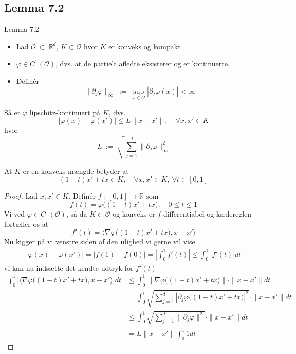 \subsection{Lemma 7.2}
\begin{boks}{Lemma 7.2}
  \begin{itemize}[label = $\ast$]
    \item Lad $\mathcal{O} \ \dot{\subset} \ \mathbb{R}^d$, $K \subset \mathcal{O}$ hvor $K$ er konveks og kompakt
    \item $\varphi \in C^1(\mathcal{O})$, dvs. at de partielt afledte eksisterer og er kontinuerte.
    \item Definér
    $$ \| \partial_j \varphi \|_\infty \ := \ \sup_{x \in \mathcal{O}} | \partial_j \varphi(x) | < \infty$$
  \end{itemize}
  Så er $\varphi$ lipschitz-kontinuert på $K$, dvs.
  $$ | \varphi(x) - \varphi(x') | \leq L \| x - x' \|, \quad \forall x,x' \in K$$
  hvor
  $$ L \ := \ \sqrt{\sum_{j = 1}^d \| \partial_j \varphi} \|^2_\infty $$
\end{boks}
At $K$ er en konveks mængde betyder at
$$ (1 - t)x' + tx \in K, \quad \forall x,x' \in K, \ \forall t \in [0,1] $$
\begin{proof}
  Lad $x,x' \in K$.
  Definér $f \ : \ [0,1] \rightarrow \mathbb{R}$ som
  $$ f(t) = \varphi\Big( (1 - t)x' + tx \Big), \quad 0 \leq t \leq 1 $$
  Vi ved $\varphi \in C^1(\mathcal{O})$, så da $K \subset \mathcal{O}$ og konveks er $f$ differentiabel og kædereglen fortæller os at
  $$ f'(t) = \langle \nabla \varphi\big( (1 - t)x' + tx \big), x - x' \rangle $$
  Nu kigger på vi venstre siden af den ulighed vi gerne vil vise
  \begin{align*}
    | \varphi(x) - \varphi(x') | =
    | f(1) - f(0) | =
    \left| \int_0^1 f'(t) \right| \leq
    \int_0^1 |f'(t)| dt
  \end{align*}
  vi kan nu indsætte det kendte udtryk for $f'(t)$
  \begin{align*}
    \int_0^1 | \langle \nabla \varphi\big( (1 - t)x' + tx \big), x - x' \rangle| dt &\leq \int_0^1 \| \nabla \varphi \big( (1 - t)x' + tx \big) \| \cdot \| x - x' \| dt \\
    &= \int_0^1 \sqrt{\sum_{j = 1}^d | \partial_j \varphi\big( (1 - t)x' + tx \big) |^2 } \cdot \| x - x' \| dt \\
    &\leq \int_0^1 \sqrt{\sum_{j = 1}^d \| \partial_j \varphi \|^2 } \cdot \| x - x' \| dt \\
    &= L \| x - x' \| \int_0^1 1 dt
  \end{align*}
\end{proof}
